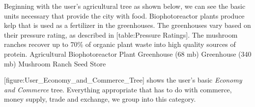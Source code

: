 Beginning with the user's agricultural tree as shown below, we can see the basic units necessary that provide the city with food. Biophotoreactor plants produce kelp that is used as a fertilizer in the greenhouses. The greenhouses vary based on their pressure rating, as described in [table:Pressure Ratings]. The mushroom ranches recover up to 70\% of organic plant waste into high quality sources of protein.
{
    \bTABLE[split=repeat]
    \setupTABLE[row][1][align=yes]
    \setupTABLE[row][each][align=center]
    \bTABLEhead
    \bTR
      \bTH Agricultural \eTH
    \eTR
    \eTABLEhead
    \bTABLEbody
    \bTR
      \bTC Biophotoreactor Plant \eTC
    \eTR
    \bTR
      \bTC Greenhouse (68 mb) \eTC
    \eTR
    \bTR
      \bTC Greenhouse (340 mb) \eTC
    \eTR
    \bTR
      \bTC Mushroom Ranch \eTC
    \eTR
    \bTR
      \bTC Seed Store \eTC
    \eTR
\eTABLEbody
\eTABLE
}

[figure:User_Economy_and_Commerce_Tree] shows the user's basic {\it Economy and Commerce} tree. Everything appropriate that has to do with commerce, money supply, trade and exchange, we group into this category.

